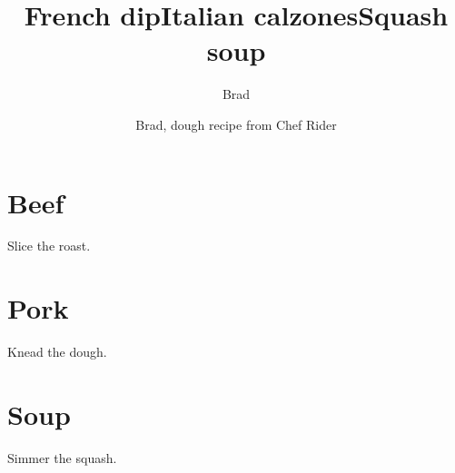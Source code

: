 \documentclass{recipemini}
\begin{document}
\tableofcontents
\section{Beef}
\author{Brad}
\title{French dip}

Slice the roast.
\section{Pork}
\author{Brad, dough recipe from Chef Rider}
\title{Italian calzones}

Knead the dough.
\section{Soup}
\title{Squash soup}

Simmer the squash.
\end{document}
